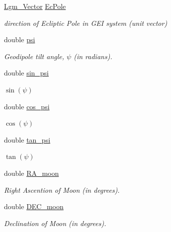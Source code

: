 \begin{CompactItemize}
\hyperlink{struct_lgm___vector}{Lgm\_\-Vector} \hyperlink{struct_lgm___c_trans_f0671f5d9fb2088ea9c46adfe6e1b7e5}{EcPole}
\begin{CompactList}\small\item\em direction of Ecliptic Pole in GEI system (unit vector) \item\end{CompactList}\item 
double \hyperlink{struct_lgm___c_trans_8614e82343ef042e83a6021f3a2ccd16}{psi}
\begin{CompactList}\small\item\em Geodipole tilt angle, $\psi$ (in radians). \item\end{CompactList}\item 
double \hyperlink{struct_lgm___c_trans_5b35fcda1a15310fa7b7e3e242431de3}{sin\_\-psi}
\begin{CompactList}\small\item\em $\sin(\psi)$ \item\end{CompactList}\item 
double \hyperlink{struct_lgm___c_trans_98e0e08bb8a65f90813e5adb482aeb2c}{cos\_\-psi}
\begin{CompactList}\small\item\em $\cos(\psi)$ \item\end{CompactList}\item 
double \hyperlink{struct_lgm___c_trans_94023304f56c47803d512bd9f0bd1f22}{tan\_\-psi}
\begin{CompactList}\small\item\em $\tan(\psi)$ \item\end{CompactList}\item 
double \hyperlink{struct_lgm___c_trans_15c641f1f3d1a34127f85cef01bb9a75}{RA\_\-moon}
\begin{CompactList}\small\item\em Right Ascention of Moon (in degrees). \item\end{CompactList}\item 
double \hyperlink{struct_lgm___c_trans_cda12dde2cd80008120d44f6738b3d64}{DEC\_\-moon}
\begin{CompactList}\small\item\em Declination of Moon (in degrees). \item\end{CompactList}\item 

\end{CompactItemize}
